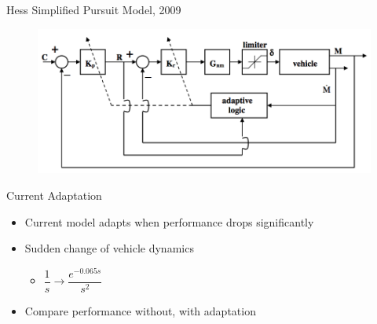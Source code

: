 \documentclass[10pt]{beamer}
\begin{document}
\begin{frame}[fragile]{Hess Simplified Pursuit Model, 2009~\cite{Hess2009}}
  \begin{figure}[h!]
    \begin{center}
      \includegraphics[width=\linewidth]{./../img/Screen_Shot_2018-08-09_at_4.15.24_PM.png}
    \end{center}
  \end{figure}
\end{frame}

\begin{frame}[fragile]{Current Adaptation}
  \begin{itemize}
    \setlength\itemsep{1em}
    \item Current model adapts when performance drops significantly
    \item Sudden change of vehicle dynamics
    \begin{itemize}
      \item $\dfrac{1}{s} \rightarrow \dfrac{e^{-0.065s}}{s^2}$
    \end{itemize}
    \item Compare performance without, with adaptation
  \end{itemize}
\end{frame}
\end{document}
